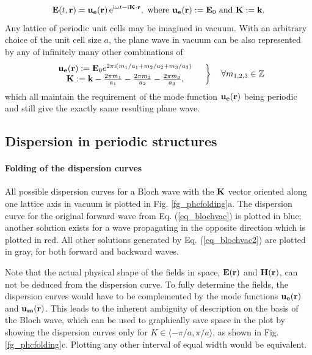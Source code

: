 \begin{equation}  
\mathbf{E}(t, {\mathbf{r}}) = \mathbf{u_e}({\mathbf{r}})\,\mathrm{e}^{{\mathrm i}\omega t - {\mathrm i}{\mathbf{K}}\cdot{\mathbf{r}}}, \text{ where } \mathbf{u_e}({\mathbf{r}}) := \mathbf{E}_0  \text{ and } {\mathbf{K}} := {\mathbf{k}}.
\label{eq_blochvac}
\end{equation}
Any lattice of periodic unit cells may be imagined in vacuum. With an arbitrary choice of the unit cell size $a$, %
the plane wave in vacuum can be also represented by any of infinitely many other combinations of
\begin{equation} 
\left.  \begin{array}{cc}
\mathbf{u_{e}}(\rr) := \E_0 e^{2\pi\ii (m_1/a_1 + m_2/a_2 + m_3/a_3)} \\ %
\KK := \kk - \frac{2\pi m_1}{a_1} - \frac{2\pi m_2}{a_2}- \frac{2\pi m_3}{a_3},
\end{array}\quad \right\} \quad \forall m_{1,2,3} \in \mathbb{Z}
\label{eq_blochvac2}
\end{equation}
which all maintain the requirement of the mode function $\mathbf{u_{e}}({\mathbf{r}})$ being periodic and still give the exactly same resulting plane wave.

\subsection{Dispersion in periodic structures}
\paragraph{Folding of the dispersion curves} %
All possible dispersion curves for a Bloch wave with the ${\mathbf{K}}$ vector oriented along one lattice axis in vacuum is plotted in Fig. \ref{fg_phcfolding}a. The dispersion curve for the original forward wave from Eq. (\ref{eq_blochvac}) is plotted in blue; another solution exists for a wave propagating in the opposite direction which is plotted in red. All other solutions generated by Eq. (\ref{eq_blochvac2}) are plotted in gray, for both forward and backward waves. 

Note that the actual physical shape of the fields in space,  $\mathbf{E}({\mathbf{r}})$ and $\mathbf{H}({\mathbf{r}})$, can not be deduced from the dispersion curve. To fully determine the fields, the dispersion curves would have to be complemented by the mode functions $\mathbf{u_e}({\mathbf{r}})$ and $\mathbf{u_m}({\mathbf{r}})$. This leads to the inherent ambiguity of description on the basis of the Bloch wave, which can be used to graphically save space in the plot by showing the dispersion curves only for $K\in\langle-\pi/a, \pi/a\rangle$, as shown in Fig. \ref{fg_phcfolding}c. Plotting any other interval of equal width would be equivalent. 


